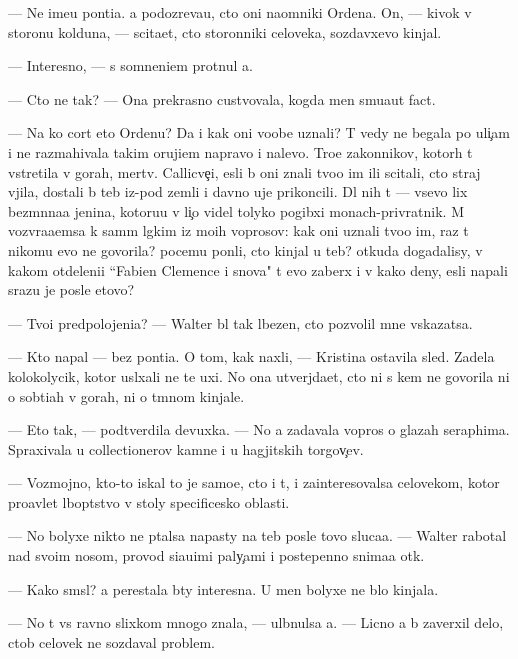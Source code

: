 \documentclass[10pt]{book}
\begin{document}
— Ne ime{\y}u pon{\ia}ti{\y}a. {\Y}a podozreva{\y}u, cto oni na{\y}omniki Ordena. On, — kivok v storonu kolduna, — scita{\y}et, cto storonniki celoveka, sozdavxevo kinjal.

— Interesno, — s somneni{\y}em prot{\ia}nul {\y}a.

— Cto ne tak? — Ona prekrasno custvovala, kogda men{\ia} smu{\x}a{\y}ut fact{\yi}.

— Na ko{\y} cort eto Ordenu? Da i kak oni voob{\x}e uznali? T{\yi} vedy ne begala po uli{\c}am i ne razmahivala takim oruji{\y}em napravo i nalevo. Tro{\y}e zakonnikov, kotor{\yi}h t{\yi} vstretila v gorah, mertv{\yi}. Callicve{\c}i, {\y}esli b{\yi} oni znali tvo{\y}o im{\ia} ili scitali, cto straj v{\yi}jila, dostali b{\yi} teb{\ia} iz-pod zemli i davno uje prikoncili. Dl{\ia} nih t{\yi} — vsevo lix bez{\yi}m{\ia}nna{\y}a jen{\x}ina, kotoru{\y}u v li{\c}o videl tolyko pogibxi{\y} monach-privratnik. M{\yi} vozvra{\x}a{\y}emsa k sam{\yi}m l{\e}gkim iz mo{\y}ih voprosov: kak oni uznali tvo{\y}o im{\ia}, raz t{\yi} nikomu {\y}evo ne govorila? pocemu pon{\ia}li, cto kinjal u teb{\ia}? otkuda dogadalisy, v kakom otdeleni{\y}i ``Fabien Clemence i s{\yi}nov{\y}a" t{\yi} {\y}evo zaber{\e}x i v kako{\y} deny, {\y}esli napali srazu je posle etovo?

— Tvo{\y}i predpolojeni{\y}a? — Walter b{\yi}l tak l{\io}bezen, cto pozvolil mne v{\yi}skazatsa.

— Kto napal — bez pon{\ia}ti{\y}a. O tom, kak naxli, — Kristina ostavila sled{\yi}. Zadela kolokolycik, kotor{\yi}{\y} usl{\yi}xali ne te uxi. No ona utverjda{\y}et, cto ni s kem ne govorila ni o sob{\yi}ti{\y}ah v gorah, ni o t{\e}mnom kinjale.

— Eto tak, — podtverdila devuxka. — No {\y}a zadavala vopros{\yi} o glazah seraphima. Spraxivala u collectionerov kamne{\y} i u hagjitskih torgov{\c}ev.

— Vozmojno, kto-to iskal to je samo{\y}e, cto i t{\yi}, i zainteresovalsa celovekom, kotor{\yi}{\y} pro{\y}avl{\ia}{\y}et l{\io}bop{\yi}tstvo v stoly specificesko{\y} oblasti.

— No bolyxe nikto ne p{\yi}talsa napasty na teb{\ia} posle tovo sluca{\y}a. — Walter rabotal nad svo{\y}im nosom, provod{\ia} si{\y}a{\y}u{\x}imi paly{\c}ami i postepenno snima{\y}a ot{\e}k.

— Kako{\y} sm{\yi}sl? {\Y}a perestala b{\yi}ty interesna. U men{\ia} bolyxe ne b{\yi}lo kinjala.

— No t{\yi} vs{\e} ravno slixkom mnogo znala, — ul{\yi}bnulsa {\y}a. — Licno {\y}a b{\yi} zaverxil delo, ctob{\yi} celovek ne sozdaval problem{\yi}.
\end{document}
